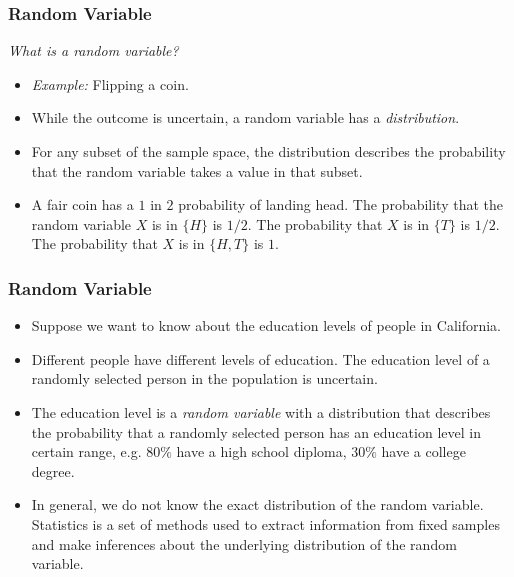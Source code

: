 

\begin{frame}
\frametitle{Random Variable} 
\emph{What is a random variable?}\pause
\begin{itemize}
\item \emph{Example:} Flipping a coin.
\item While the outcome is uncertain, a random variable has a  \emph{distribution}. 
\item For any subset of the sample space, the distribution describes the probability that the random variable takes a value in that subset. 
\item A fair coin has a $1$ in $2$ probability of landing head. The probability that the random variable $X$ is in $\{H\}$ is $1/2$. The probability that $X$ is in $\{T\}$ is $1/2$. The probability that $X$ is in $\{H,T\}$ is $1$.
\end{itemize}
\end{frame}


\begin{frame}
\frametitle{Random Variable}
\begin{itemize}
\item Suppose we want to know about the education levels of people in California.
\item Different people have different levels of education. The education level of a randomly selected person in the population is uncertain. 
\item The education level is a \emph{random variable} with a distribution that describes the probability that a randomly selected person has an education level in certain range, e.g. $80\%$ have a high school diploma, $30\%$ have a college degree. 
\item In general, we do not know the exact distribution of the random variable. Statistics is a set of methods used to extract information from fixed samples and make inferences about the underlying distribution of the random variable.
\end{itemize}
\end{frame}


